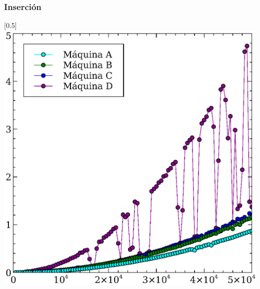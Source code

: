 \documentclass[compress]{beamer}
\begin{document}
\begin{frame}
\frametitle{Inserción}
	\begin{center}
\scalebox{0.53}[0.5]{
    \includegraphics[]{insercion_todos.eps}
}
\end{center}
\end{frame}
\end{document}
